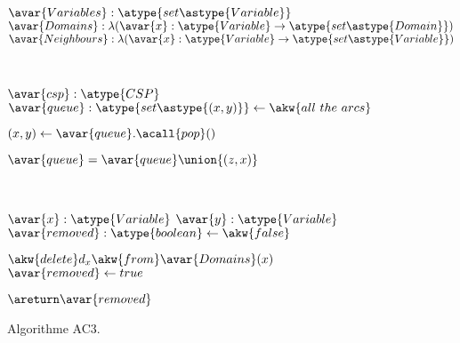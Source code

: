 \begin{figure}

\begin{center}
\begin{algorithmic}

\State $\avar{Variables}: \atype{set\astype{Variable}}$
\State $\avar{Domains}: \lambda (\avar{x}: \atype{Variable} \rightarrow \atype{set\astype{Domain}})$
\State $\avar{Neighbours}: \lambda (\avar{x}: \atype{Variable} \rightarrow \atype{set\astype{Variable}})$

\\\hrulefill


  \Require $\avar{csp}: \atype{CSP}$
  \State $\avar{queue}: \atype{set\astype{(x, y)}} \gets \akw{all~the~arcs}$


      \State $(x, y) \gets \avar{queue}.\acall{pop}()$



              \State $\avar{queue} = \avar{queue} \union \{(z, x)\}$

          \EndFor

      \EndIf

  \EndWhile

\EndFunction

\\\hrulefill


    \Require $\avar{x}: \atype{Variable}$
    \Require $\avar{y}: \atype{Variable}$
    \Ensure  $\avar{removed}: \atype{boolean} \gets \akw{false}$



            \State $\akw{delete} d_x \akw{from} \avar{Domains}(x)$
            \State $\avar{removed} \gets true$

        \EndIf

    \EndFor

    \State $\areturn \avar{removed}$

\EndFunction

\end{algorithmic}
\end{center}

\caption{\label{figure:data:ac3} Algorithme AC3.}

\end{figure}

